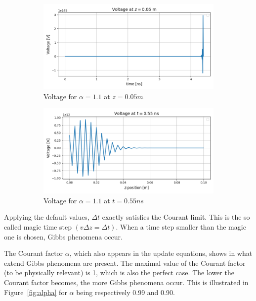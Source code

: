 \begin{figure}[! h]
\centering
\begin{subfigure}{.5\textwidth}
  \centering
  \includegraphics[width=.9\linewidth]{figures/alpha=1.1(z).png}
  \caption{Voltage for $\alpha = 1.1$ at $z = 0.05m$}
  \label{fig:dt1}
\end{subfigure}%
\begin{subfigure}{.5\textwidth}
  \centering
  \includegraphics[width=.9\linewidth]{figures/alpha=1.1(t).png}
  \caption{Voltage for $\alpha = 1.1$ at $t = 0.55ns$}
  \label{fig:dt2}
\end{subfigure}
\caption{}
\label{fig:test}
\end{figure}

Applying the default values, $\Delta t$ exactly satisfies the Courant limit. This is the so called magic time step $(v\Delta z = \Delta t)$. When a time step smaller than the magic one is chosen, Gibbs phenomena occur.



The Courant factor $\alpha$, which also appears in the update equations, shows in what extend Gibbs phenomena are present. The maximal value of the Courant factor (to be physically relevant) is 1, which is also the perfect case. The lower the Courant factor becomes, the more Gibbs phenomena occur. This is illustrated in Figure~\ref{fig:alpha} for $\alpha$ being respectively 0.99 and 0.90. 

